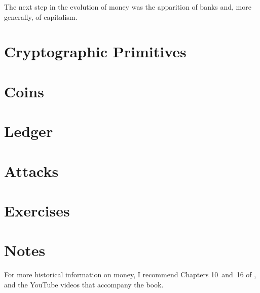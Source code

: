 The next step in the evolution of money was the apparition of banks and, more generally, of capitalism.


\section{Cryptographic Primitives}

\section{Coins}

\section{Ledger}

\section{Attacks}

\section{Exercises}


\section{Notes}

For more historical information on money, I recommend Chapters 10~and~16 of \citet{sapiens}, and the YouTube videos that accompany the book.


